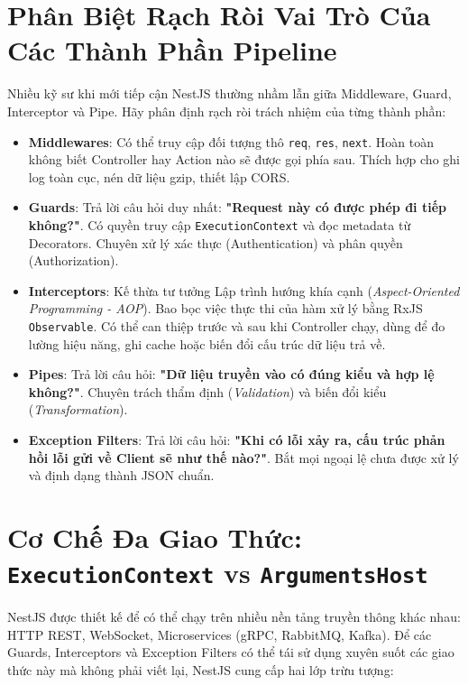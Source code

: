 \documentclass[12pt,a4paper,oneside]{book}
\begin{document}
\section{Phân Biệt Rạch Ròi Vai Trò Của Các Thành Phần Pipeline}
Nhiều kỹ sư khi mới tiếp cận NestJS thường nhầm lẫn giữa Middleware, Guard, Interceptor và Pipe. Hãy phân định rạch ròi trách nhiệm của từng thành phần:
\begin{itemize}
  \item \textbf{Middlewares}: Có thể truy cập đối tượng thô \texttt{req}, \texttt{res}, \texttt{next}. Hoàn toàn không biết Controller hay Action nào sẽ được gọi phía sau. Thích hợp cho ghi log toàn cục, nén dữ liệu gzip, thiết lập CORS.
  \item \textbf{Guards}: Trả lời câu hỏi duy nhất: \textbf{"Request này có được phép đi tiếp không?"}. Có quyền truy cập \texttt{ExecutionContext} và đọc metadata từ Decorators. Chuyên xử lý xác thực (Authentication) và phân quyền (Authorization).
  \item \textbf{Interceptors}: Kế thừa tư tưởng Lập trình hướng khía cạnh (\textit{Aspect-Oriented Programming - AOP}). Bao bọc việc thực thi của hàm xử lý bằng RxJS \texttt{Observable}. Có thể can thiệp trước và sau khi Controller chạy, dùng để đo lường hiệu năng, ghi cache hoặc biến đổi cấu trúc dữ liệu trả về.
  \item \textbf{Pipes}: Trả lời câu hỏi: \textbf{"Dữ liệu truyền vào có đúng kiểu và hợp lệ không?"}. Chuyên trách thẩm định (\textit{Validation}) và biến đổi kiểu (\textit{Transformation}).
  \item \textbf{Exception Filters}: Trả lời câu hỏi: \textbf{"Khi có lỗi xảy ra, cấu trúc phản hồi lỗi gửi về Client sẽ như thế nào?"}. Bắt mọi ngoại lệ chưa được xử lý và định dạng thành JSON chuẩn.
\end{itemize}

\section{Cơ Chế Đa Giao Thức: \texttt{ExecutionContext} vs \texttt{ArgumentsHost}}
NestJS được thiết kế để có thể chạy trên nhiều nền tảng truyền thông khác nhau: HTTP REST, WebSocket, Microservices (gRPC, RabbitMQ, Kafka). Để các Guards, Interceptors và Exception Filters có thể tái sử dụng xuyên suốt các giao thức này mà không phải viết lại, NestJS cung cấp hai lớp trừu tượng:
\end{document}
